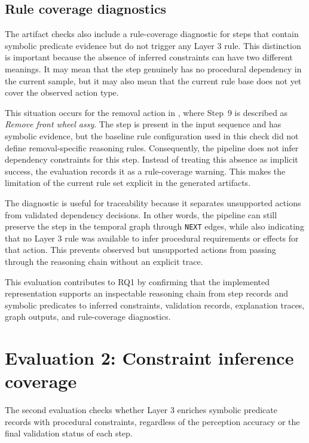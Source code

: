 \subsection{Rule coverage diagnostics}
\label{sec:evaluation-rule-coverage-diagnostics}

The artifact checks also include a rule-coverage diagnostic for steps that contain symbolic predicate evidence but do not trigger any Layer 3 rule. This distinction is important because the absence of inferred constraints can have two different meanings. It may mean that the step genuinely has no procedural dependency in the current sample, but it may also mean that the current rule base does not yet cover the observed action type.

This situation occurs for the removal action in ,
where Step~9 is described as \textit{Remove front wheel assy}. The step is present in the input sequence and has symbolic evidence, but the baseline rule configuration used in this check did not define removal-specific reasoning rules. Consequently, the pipeline does not infer dependency constraints for this step. Instead of treating this absence as implicit success, the evaluation records it as a rule-coverage warning. This makes the limitation of the current rule set explicit in the generated artifacts.

The diagnostic is useful for traceability because it separates unsupported actions
from validated dependency decisions. In other words, the pipeline can still preserve
the step in the temporal graph through \texttt{NEXT} edges, while also indicating
that no Layer 3 rule was available to infer procedural requirements or effects for
that action. This prevents observed but unsupported actions from passing through
the reasoning chain without an explicit trace.

This evaluation contributes to RQ1 by confirming that the implemented
representation supports an inspectable reasoning chain from step records and
symbolic predicates to inferred constraints, validation records, explanation
traces, graph outputs, and rule-coverage diagnostics.

\section{Evaluation 2: Constraint inference coverage}
\label{sec:evaluation-constraint-coverage}

The second evaluation checks whether Layer 3 enriches symbolic predicate records
with procedural constraints, regardless of the perception accuracy or the final validation status of each step. 

